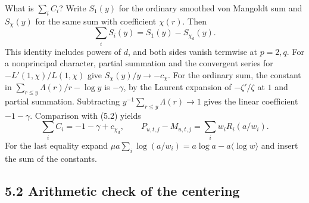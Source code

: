 \documentclass[11pt,letterpaper]{article}
\begin{document}
{What is $\sum_i C_i$? Write $S_1(y)$ for the ordinary smoothed von Mangoldt sum and $S_\chi(y)$ for the same sum with coefficient $\chi(r)$. Then
\begin{equation}\label{D:62}
 \sum_i S_i(y)= S_1(y)-S_{\chi_d}(y).
\end{equation}
This identity includes powers of $d$, and both sides vanish termwise at $p=2,q$. For a nonprincipal character, partial summation and the convergent series for $-L'(1,\chi)/L(1,\chi)$ give $S_\chi(y)/y\to-c_\chi$. For the ordinary sum, the constant in $\sum_{r\le y}\Lambda(r)/r-\log y$ is $-\gamma$, by the Laurent expansion of $-\zeta'/\zeta$ at $1$ and partial summation. Subtracting $y^{-1}\sum_{r\le y}\Lambda(r)\to1$ gives the linear coefficient $-1-\gamma$. Comparison with (5.2) yields
\begin{equation}\label{D:63}
 \sum_i C_i=-1-\gamma+c_{\chi_d},\qquad
 P_{u,t,j}-M_{u,t,j}=\sum_i w_iR_i(a/w_i).                   \tag{5.3}
\end{equation}
For the last equality expand $\mu a\sum_i\log(a/w_i)=a\log a-a\langle\log w\rangle$ and insert the sum of the constants.

\newpage
\subsection*{5.2 Arithmetic check of the centering}

}
\end{document}

